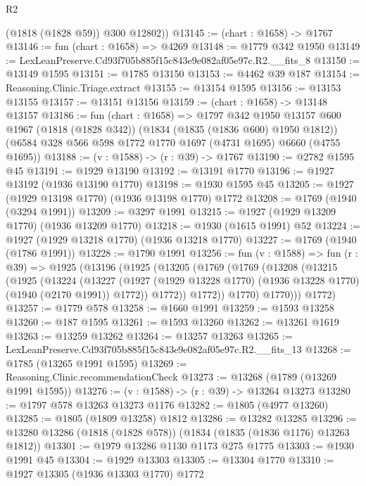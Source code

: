 \begin{lexlean}{R2}
\begin{coremodule}
        (@1818 (@1828 @59))
        @300
        @12802))
@13145 := (chart : @1658) -> @1767
@13146 := fun (chart : @1658) => @4269
@13148 := @1779 @342 @1950
@13149 := LexLeanPreserve.Cd93f705b885f15c843e9e082af05e97c.R2.__fits_8
@13150 := @13149 @1595
@13151 := @1785 @13150
@13153 := @4462 @39 @187
@13154 := Reasoning.Clinic.Triage.extract
@13155 := @13154 @1595
@13156 := @13153 @13155
@13157 := @13151 @13156
@13159 := (chart : @1658) -> @13148 @13157
@13186 := fun (chart : @1658) =>
  @1797
    @342
    @1950
    @13157
    @600
    @1967
    (@1818 (@1828 @342))
    (@1834 (@1835 (@1836 @600) @1950 @1812))
    (@6584 @328 @566 @598 @1772 @1770 @1697 (@4731 @1695) @6660 (@4755 @1695))
@13188 := (v : @1588) -> (r : @39) -> @1767
@13190 := @2782 @1595 @45
@13191 := @1929 @13190
@13192 := @13191 @1770
@13196 := @1927 @13192 (@1936 @13190 @1770)
@13198 := @1930 @1595 @45
@13205 := @1927 (@1929 @13198 @1770) (@1936 @13198 @1770) @1772
@13208 := @1769 (@1940 (@3294 @1991))
@13209 := @3297 @1991
@13215 := @1927 (@1929 @13209 @1770) (@1936 @13209 @1770)
@13218 := @1930 (@1615 @1991) @52
@13224 := @1927 (@1929 @13218 @1770) (@1936 @13218 @1770)
@13227 := @1769 (@1940 (@1786 @1991))
@13228 := @1790 @1991
@13256 := fun (v : @1588) =>
  fun (r : @39) =>
  @1925
    (@13196
      (@1925
        (@13205
          (@1769
            (@1769
              (@13208
                (@13215
                  (@1925
                    (@13224
                      (@13227
                        (@1927
                          (@1929 @13228 @1770)
                          (@1936 @13228 @1770)
                          (@1940 (@2170 @1991))
                          @1772))
                      @1772))
                  @1772))
              @1770)
            @1770)))
      @1772)
@13257 := @1779 @578
@13258 := @1660 @1991
@13259 := @1593 @13258
@13260 := @187 @1595
@13261 := @1593 @13260
@13262 := @13261 @1619
@13263 := @13259 @13262
@13264 := @13257 @13263
@13265 := LexLeanPreserve.Cd93f705b885f15c843e9e082af05e97c.R2.__fits_13
@13268 := @1785 (@13265 @1991 @1595)
@13269 := Reasoning.Clinic.recommendationCheck
@13273 := @13268 (@1789 (@13269 @1991 @1595))
@13276 := (v : @1588) -> (r : @39) -> @13264 @13273
@13280 := @1797 @578 @13263 @13273 @1176
@13282 := @1805 (@4977 @13260)
@13285 := @1805 (@1809 @13258) @1812
@13286 := @13282 @13285
@13296 := @13280 @13286 (@1818 (@1828 @578)) (@1834 (@1835 (@1836 @1176) @13263 @1812))
@13301 := @1979 @13286 @1130 @1173 @275 @1775
@13303 := @1930 @1991 @45
@13304 := @1929 @13303
@13305 := @13304 @1770
@13310 := @1927 @13305 (@1936 @13303 @1770) @1772

\end{coremodule}
\end{lexlean}
